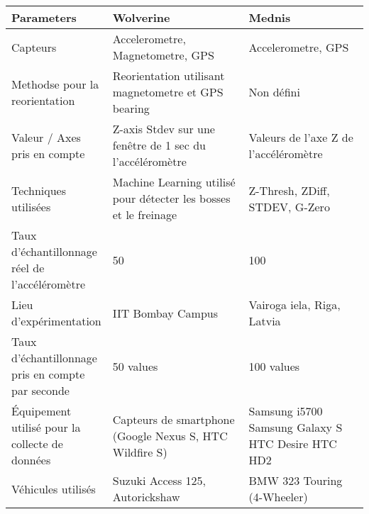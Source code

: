 
\begin{table}[]
    \centering
    \begin{tabular}{|m{0.25\linewidth}|m{0.4\linewidth}|m{0.35\linewidth}|}
        \hline
        Parameters                                         & Wolverine                                                        & Mednis                                                   \\
        \hline
        Capteurs                                           & Accelerometre, Magnetometre, GPS                                 & Accelerometre, GPS                                       \\
        \hline
        Methodse pour la reorientation                     & Reorientation utilisant magnetometre et GPS bearing              & Non défini                                               \\
        \hline
        Valeur / Axes pris en compte                       & Z-axis Stdev sur une fenêtre de 1 sec du l'accéléromètre         & Valeurs de l'axe Z de l'accéléromètre                    \\
        \hline
        Techniques utilisées                               & Machine Learning utilisé pour détecter les bosses et le freinage & Z-Thresh, ZDiff, STDEV, G-Zero                           \\
        \hline
        Taux d'échantillonnage réel de l'accéléromètre     & 50                                                               & 100                                                      \\
        \hline
        Lieu d'expérimentation                             & IIT Bombay Campus                                                & Vairoga iela, Riga, Latvia                               \\
        \hline
        Taux d'échantillonnage pris en compte par seconde  & 50 values                                                        & 100 values                                               \\
        \hline
        Équipement utilisé pour la collecte de données     & Capteurs de smartphone (Google Nexus S, HTC Wildfire S)          & Samsung i5700 Samsung Galaxy S HTC Desire HTC HD2        \\
        \hline
        Véhicules utilisés                                 & Suzuki Access 125, Autorickshaw                                  & BMW 323 Touring (4-Wheeler)                              \\

\end{tabular}
\end{table}
